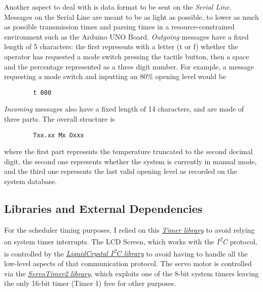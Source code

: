 \documentclass[a4paper,12pt]{report}
\begin{document}
	\newline Another aspect to deal with is data format to be sent on the \textit{Serial Line}. Messages on the Serial Line are meant to be as light as possible, to lower as much as possible transmission times and parsing times in a resource-constrained environment such as the Arduino UNO Board.
	\newline \textit{Outgoing} messages have a fixed length of 5 characters: the first represents with a letter (t or f) whether the operator has requested a mode switch pressing the tactile button, then a space and the percentage represented as a three digit number. For example, a message requesting a mode switch and inputting an 80\% opening level would be
	\begin{verbatim}
		t 080
	\end{verbatim}
	\textit{Incoming} messages also have a fixed length of 14 characters, and are made of three parts. The overall structure is
	\begin{verbatim}
		Txx.xx Mx Oxxx
	\end{verbatim}
	where the first part represents the temperature truncated to the second decimal digit, the second one represents whether the system is currently in manual mode, and the third one represents the last valid opening level as recorded on the system database.
		\subsection{Libraries and External Dependencies}
		For the scheduler timing purposes, I relied on this \href{https://github.com/sstaub/Timer}{\textit{Timer library}} to avoid relying on system timer interrupts.
		\newline The LCD Screen, which works with the \textit{I\textsuperscript{2}C} protocol, is controlled by the \href{https://docs.arduino.cc/libraries/liquidcrystal-i2c/}{\textit{LiquidCrystal I\textsuperscript{2}C library}} to avoid having to handle all the low-level aspects of that communication protocol.
		\newline The servo motor is controlled via the \href{https://github.com/nabontra/ServoTimer2}{\textit{ServoTimer2 library}}, which exploits one of the 8-bit system timers leaving the only 16-bit timer (Timer 1) free for other purposes.
\end{document}
